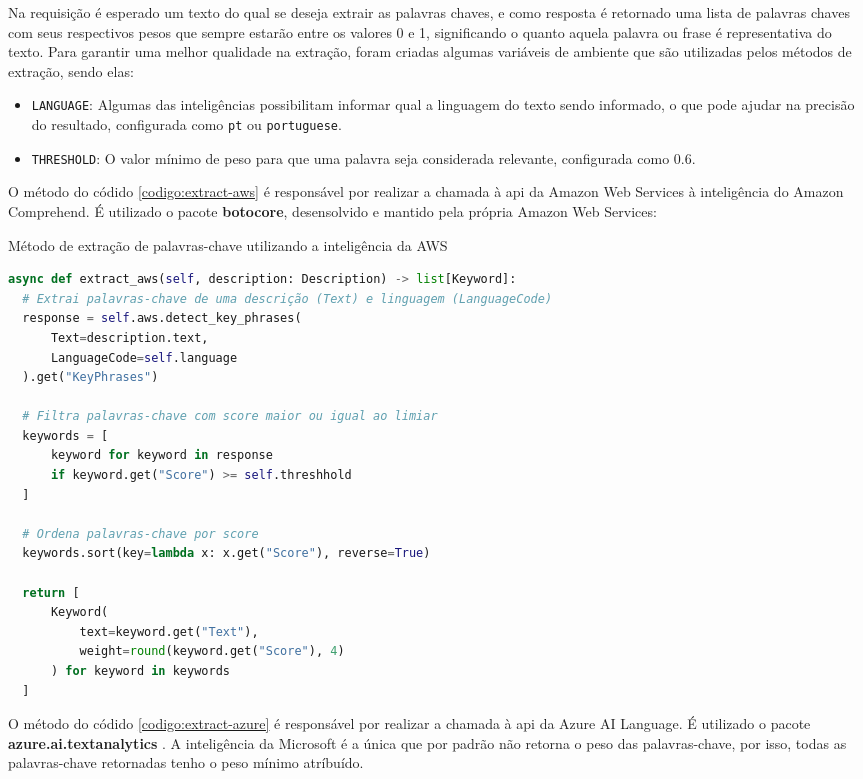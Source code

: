 Na requisição é esperado um texto do qual se deseja extrair as palavras chaves, e como resposta é retornado uma lista de palavras chaves com seus respectivos pesos que sempre estarão entre os valores 0 e 1, significando o quanto aquela palavra ou frase é representativa do texto. Para garantir uma melhor qualidade na extração, foram criadas algumas variáveis de ambiente que são utilizadas pelos métodos de extração, sendo elas:

\begin{itemize}
  \item \texttt{LANGUAGE}: Algumas das inteligências possibilitam informar qual a linguagem do texto sendo informado, o que pode ajudar na precisão do resultado, configurada como \texttt{pt} ou \texttt{portuguese}.
  \item \texttt{THRESHOLD}: O valor mínimo de peso para que uma palavra seja considerada relevante, configurada como 0.6.
\end{itemize}

O método do códido \ref{codigo:extract-aws} é responsável por realizar a chamada à \gls{api} da Amazon Web Services à inteligência do Amazon Comprehend. É utilizado o pacote \textbf{botocore}, desensolvido e mantido pela própria Amazon Web Services:

\begin{sourcecode}[H]
  \caption{\label{codigo:extract-aws}Método de extração de palavras-chave utilizando a inteligência da AWS}
  \begin{lstlisting}[frame=single, language=Python]
async def extract_aws(self, description: Description) -> list[Keyword]:
  # Extrai palavras-chave de uma descrição (Text) e linguagem (LanguageCode)
  response = self.aws.detect_key_phrases(
      Text=description.text, 
      LanguageCode=self.language
  ).get("KeyPhrases")

  # Filtra palavras-chave com score maior ou igual ao limiar
  keywords = [
      keyword for keyword in response 
      if keyword.get("Score") >= self.threshhold
  ]

  # Ordena palavras-chave por score
  keywords.sort(key=lambda x: x.get("Score"), reverse=True)

  return [
      Keyword(
          text=keyword.get("Text"), 
          weight=round(keyword.get("Score"), 4)
      ) for keyword in keywords
  ]
\end{lstlisting}
  \fonte{}
\end{sourcecode}

O método do códido \ref{codigo:extract-azure} é responsável por realizar a chamada à \gls{api} da Azure AI Language. É utilizado o pacote \textbf{azure.ai.textanalytics} \cite{Alcarlucci2023}. A inteligência da Microsoft é a única que por padrão não retorna o peso das palavras-chave, por isso, todas as palavras-chave retornadas tenho o peso mínimo atríbuído.

